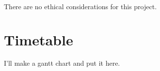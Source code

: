 \documentclass[a4paper,fleqn,11pt]{article}
\begin{document}
There are no ethical considerations for this project.

\section{Timetable}
I'll make a gantt chart and put it here.

% 
% 
% 
% 



\end{document}
